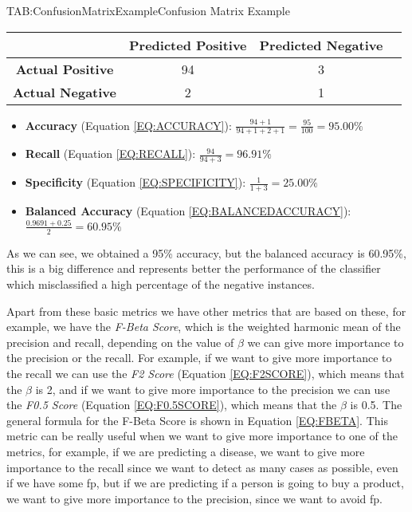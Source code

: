\begin{table}[Confusion Matrix Example]{TAB:ConfusionMatrixExample}{Confusion Matrix Example}
    \begin{tabular}{cccc}
            \hline
            & \textbf{Predicted Positive} & \textbf{Predicted Negative} \\
            \hline \hline
            \textbf{Actual Positive} & 94 & 3 \\
            \textbf{Actual Negative} & 2 & 1 \\
            \hline
        \end{tabular}
\end{table}

\begin{itemize}
    \item \textbf{Accuracy} (Equation \ref{EQ:ACCURACY}): $\frac{94 + 1}{94+1+2+1} = \frac{95}{100} = 95.00\%$
    \item \textbf{Recall} (Equation \ref{EQ:RECALL}): $\frac{94}{94+3} = 96.91\%$
    \item \textbf{Specificity} (Equation \ref{EQ:SPECIFICITY}): $\frac{1}{1+3} = 25.00\%$
    \item \textbf{Balanced Accuracy} (Equation \ref{EQ:BALANCEDACCURACY}): $\frac{0.9691 + 0.25}{2} = 60.95\%$
\end{itemize}

As we can see, we obtained a 95\% accuracy, but the balanced accuracy is 60.95\%, this is a big difference and represents better the performance of the classifier which misclassified a high percentage of the negative instances.

Apart from these basic metrics we have other metrics that are based on these, for example, we have the \textit{F-Beta Score}, which is the weighted harmonic mean of the precision and recall, depending on the value of $\beta$ we can give more importance to the precision or the recall. For example, if we want to give more importance to the recall we can use the \textit{F2 Score} (Equation \ref{EQ:F2SCORE}), which means that the $\beta$ is 2, and if we want to give more importance to the precision we can use the \textit{F0.5 Score} (Equation \ref{EQ:F0.5SCORE}), which means that the $\beta$ is 0.5. The general formula for the F-Beta Score is shown in Equation \ref{EQ:FBETA}. This metric can be really useful when we want to give more importance to one of the metrics, for example, if we are predicting a disease, we want to give more importance to the recall since we want to detect as many cases as possible, even if we have some \ac{fp}, but if we are predicting if a person is going to buy a product, we want to give more importance to the precision, since we want to avoid \ac{fp}.

